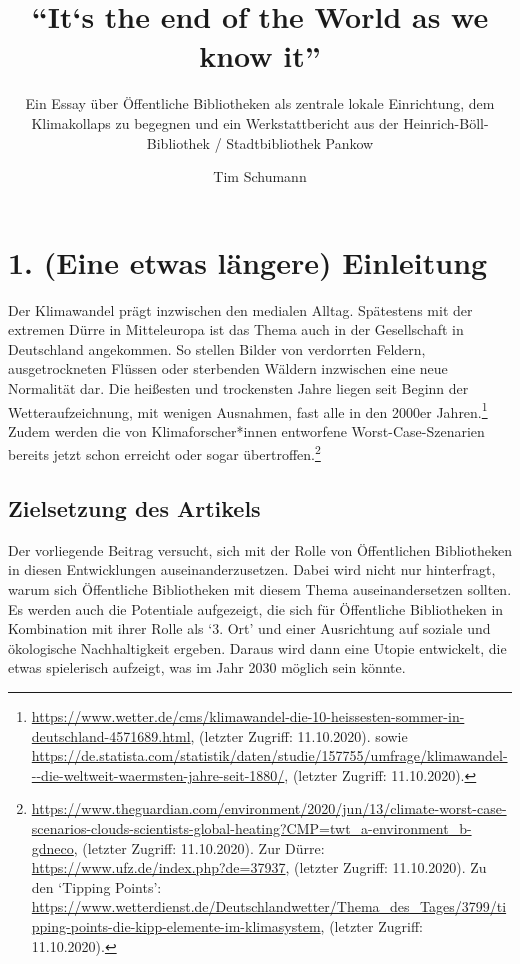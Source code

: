 \documentclass[a4paper,
fontsize=11pt,
oneside,
numbers=noperiodatend,
parskip=half-,
bibliography=totoc,
final
]{scrartcl}
\title{\LARGE{\enquote{It‘s the end of the World as we know it}}}%
\subtitle{\Large{Ein Essay über Öffentliche Bibliotheken als zentrale lokale Einrichtung, dem Klimakollaps zu begegnen und ein Werkstattbericht aus der Heinrich-Böll-Bibliothek / Stadtbibliothek Pankow}}
\author{Tim Schumann} %
\date{}
\begin{document}
\maketitle
\thispagestyle{fancyplain} 


\hypertarget{eine-etwas-luxe4ngere-einleitung}{%
\section{1. (Eine etwas längere)
Einleitung}\label{eine-etwas-luxe4ngere-einleitung}}

Der Klimawandel prägt inzwischen den medialen Alltag. Spätestens mit der
extremen Dürre in Mitteleuropa ist das Thema auch in der Gesellschaft in
Deutschland angekommen. So stellen Bilder von verdorrten Feldern,
ausgetrockneten Flüssen oder sterbenden Wäldern inzwischen eine neue
Normalität dar. Die heißesten und trockensten Jahre liegen seit Beginn
der Wetteraufzeichnung, mit wenigen Ausnahmen, fast alle in den 2000er
Jahren.\footnote{\url{https://www.wetter.de/cms/klimawandel-die-10-heissesten-sommer-in-deutschland-4571689.html},
  (letzter Zugriff: 11.10.2020). sowie
  \url{https://de.statista.com/statistik/daten/studie/157755/umfrage/klimawandel---die-weltweit-waermsten-jahre-seit-1880/},
  (letzter Zugriff: 11.10.2020).} Zudem werden die von
Klimaforscher*innen entworfene Worst-Case-Szenarien bereits jetzt schon
erreicht oder sogar übertroffen.\footnote{\url{https://www.theguardian.com/environment/2020/jun/13/climate-worst-case-scenarios-clouds-scientists-global-heating?CMP=twt_a-environment_b-gdneco},
  (letzter Zugriff: 11.10.2020). Zur Dürre:
  \url{https://www.ufz.de/index.php?de=37937}, (letzter Zugriff:
  11.10.2020). Zu den \enquote*{Tipping Points}:
  \url{https://www.wetterdienst.de/Deutschlandwetter/Thema_des_Tages/3799/tipping-points-die-kipp-elemente-im-klimasystem},
  (letzter Zugriff: 11.10.2020).}

\hypertarget{zielsetzung-des-artikels}{%
\subsection{Zielsetzung des Artikels}\label{zielsetzung-des-artikels}}

Der vorliegende Beitrag versucht, sich mit der Rolle von Öffentlichen
Bibliotheken in diesen Entwicklungen auseinanderzusetzen. Dabei wird
nicht nur hinterfragt, warum sich Öffentliche Bibliotheken mit diesem
Thema auseinandersetzen sollten. Es werden auch die Potentiale
aufgezeigt, die sich für Öffentliche Bibliotheken in Kombination mit
ihrer Rolle als \enquote*{3. Ort} und einer Ausrichtung auf soziale und
ökologische Nachhaltigkeit ergeben. Daraus wird dann eine Utopie
entwickelt, die etwas spielerisch aufzeigt, was im Jahr 2030 möglich
sein könnte.
\end{document}
